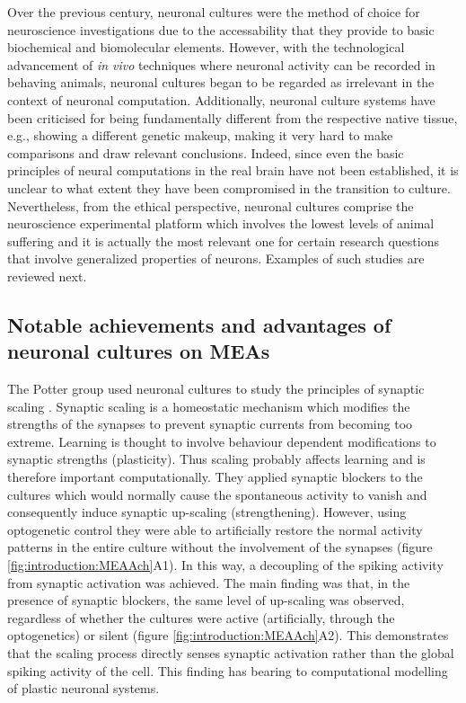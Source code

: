     Over the previous century, neuronal cultures were the method of choice for neuroscience investigations due to the accessability that they provide to basic biochemical and biomolecular elements. However, with the technological advancement of \textit{in vivo} techniques where neuronal activity can be recorded in behaving animals, neuronal cultures began to be regarded as irrelevant in the context of neuronal computation. Additionally, neuronal culture systems have been criticised for being fundamentally different from the respective native tissue, e.g., showing a different genetic makeup, making it very hard to make comparisons and draw relevant conclusions. Indeed, since even the basic principles of neural computations in the real brain have not been established, it is unclear to what extent they have been compromised in the transition to culture. Nevertheless, from the ethical perspective, neuronal cultures comprise the neuroscience experimental platform which involves the lowest levels of animal suffering and it is actually the most relevant one for certain research questions that involve generalized properties of neurons. Examples of such studies are reviewed next.

    \subsection{Notable achievements and advantages of neuronal cultures on MEAs}
	\label{sec:introduction:achievements}

    The Potter group used neuronal cultures to study the principles of synaptic scaling \cite{fong2015upward}. Synaptic scaling is a homeostatic mechanism which modifies the strengths of the synapses to prevent synaptic currents from becoming too extreme. Learning is thought to involve behaviour dependent modifications to synaptic strengths (plasticity). Thus scaling probably affects learning and is therefore important computationally. They applied synaptic blockers to the cultures which would normally cause the spontaneous activity to vanish and consequently induce synaptic up-scaling (strengthening). However, using optogenetic control they were able to artificially restore the normal activity patterns in the entire culture without the involvement of the synapses (figure \ref{fig:introduction:MEAAch}A1). In this way, a decoupling of the spiking activity from synaptic activation was achieved. The main finding was that, in the presence of synaptic blockers, the same level of up-scaling was observed, regardless of whether the cultures were active (artificially, through the optogenetics) or silent (figure \ref{fig:introduction:MEAAch}A2). This demonstrates that the scaling process directly senses synaptic activation rather than the global spiking activity of the cell. This finding has bearing to computational modelling of plastic neuronal systems.

